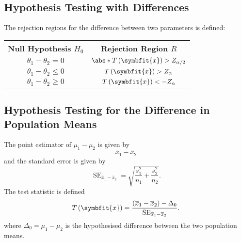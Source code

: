 \documentclass{article}
\begin{document}
\subsection{Hypothesis Testing with Differences}
The rejection regions for the difference between two parameters is defined:
\begin{center}
    \begin{tabular}{cc}
        \toprule
        \textbf{Null Hypothesis} \(H_0\) & \textbf{Rejection Region} \(R\)                       \\
        \midrule
        \(\theta_1 - \theta_2 = 0\)      & \(\abs*{T\left( \symbfit{x} \right)} > Z_{\alpha/2}\) \\
        \(\theta_1 - \theta_2 \leq 0\)   & \(T\left( \symbfit{x} \right) > Z_{\alpha}\)          \\
        \(\theta_1 - \theta_2 \geq 0\)   & \(T\left( \symbfit{x} \right) < -Z_{\alpha}\)         \\
        \bottomrule
    \end{tabular}
\end{center}
\subsection{Hypothesis Testing for the Difference in Population Means}
The point estimator of \(\mu_1 - \mu_2\) is given by
\begin{equation*}
    \overline{x}_1 - \overline{x}_2
\end{equation*}
and the standard error is given by
\begin{equation*}
    \operatorname{SE}_{\overline{x}_1 - \overline{x}_2} = \sqrt{\frac{s_1^2}{n_1} + \frac{s_2^2}{n_2}}.
\end{equation*}
The test statistic is defined
\begin{equation*}
    T\left( \symbfit{x} \right) = \frac{\left( \overline{x}_1 - \overline{x}_2 \right) - \Delta_0}{\operatorname{SE}_{\overline{x}_1 - \overline{x}_2}}.
\end{equation*}
where \(\Delta_0 = \mu_1 - \mu_2\) is the hypothesised difference between the two population means.
\end{document}
